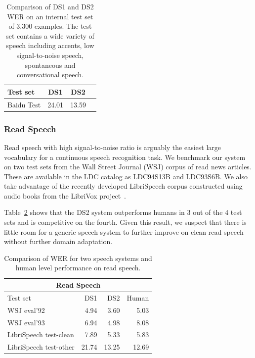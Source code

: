 \documentclass{article}
\begin{document}
\begin{table}
\centering
\begin{tabular}{l  c  c  c}
\toprule
Test set   & DS1 & DS2 \\
\midrule
Baidu Test & 24.01  & 13.59 \\
\bottomrule
\end{tabular}
\caption{Comparison of DS1 and DS2 WER on an internal test set of 3,300 examples. The test set contains a wide variety of speech including accents, low signal-to-noise speech, spontaneous and conversational speech.}
\label{table:test}
\end{table}

\subsubsection{Read Speech}

Read speech with high signal-to-noise ratio is arguably the easiest large vocabulary for a continuous speech recognition task. We benchmark our system on two test sets from the Wall Street Journal (WSJ) corpus of read news articles. These are available in the LDC catalog as LDC94S13B and LDC93S6B. We also take advantage of the recently developed LibriSpeech corpus constructed using audio books from the LibriVox project~\cite{panayotov2015}.

Table~\ref{table:readspeech} shows that the DS2 system outperforms humans in 3 out of the 4 test sets and is competitive on the fourth. Given this result, we suspect that there is little room for a generic speech system to further improve on clean read speech without further domain adaptation.

\begin{table}
\centering
\begin{tabular}{l  r  r r}
\toprule
\multicolumn{4}{c}{Read Speech}\\
\midrule
Test set               & DS1   & DS2 &  Human \\ 
\midrule
WSJ eval'92            & 4.94  & 3.60  & 5.03 \\ 
WSJ eval'93            & 6.94  & 4.98  & 8.08 \\ 
LibriSpeech test-clean & 7.89  & 5.33  & 5.83 \\ 
LibriSpeech test-other & 21.74 & 13.25 & 12.69 \\ 
\bottomrule
\end{tabular}
\caption{Comparison of WER for two speech systems and human level performance on read speech.}
\label{table:readspeech}
\end{table}
\end{document}
